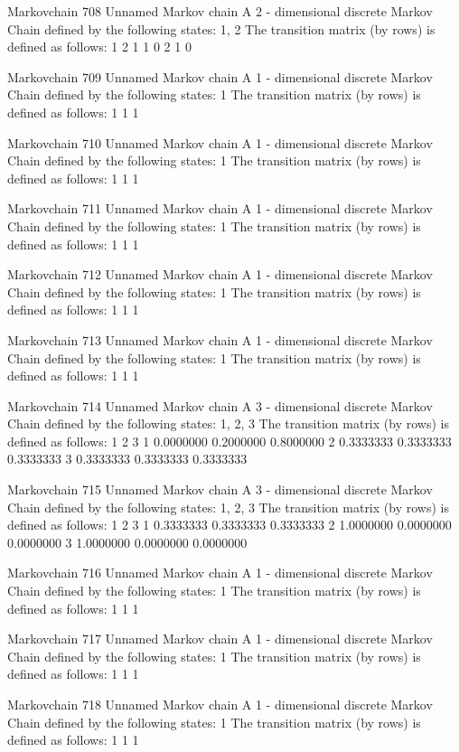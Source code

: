 \documentclass[
  nojss]{jss}
\begin{document}
\begin{CodeChunk}
\begin{CodeOutput}
Markovchain  708 
Unnamed Markov chain 
 A  2 - dimensional discrete Markov Chain defined by the following states: 
 1, 2 
 The transition matrix  (by rows)  is defined as follows: 
  1 2
1 1 0
2 1 0

Markovchain  709 
Unnamed Markov chain 
 A  1 - dimensional discrete Markov Chain defined by the following states: 
 1 
 The transition matrix  (by rows)  is defined as follows: 
  1
1 1

Markovchain  710 
Unnamed Markov chain 
 A  1 - dimensional discrete Markov Chain defined by the following states: 
 1 
 The transition matrix  (by rows)  is defined as follows: 
  1
1 1

Markovchain  711 
Unnamed Markov chain 
 A  1 - dimensional discrete Markov Chain defined by the following states: 
 1 
 The transition matrix  (by rows)  is defined as follows: 
  1
1 1

Markovchain  712 
Unnamed Markov chain 
 A  1 - dimensional discrete Markov Chain defined by the following states: 
 1 
 The transition matrix  (by rows)  is defined as follows: 
  1
1 1

Markovchain  713 
Unnamed Markov chain 
 A  1 - dimensional discrete Markov Chain defined by the following states: 
 1 
 The transition matrix  (by rows)  is defined as follows: 
  1
1 1

Markovchain  714 
Unnamed Markov chain 
 A  3 - dimensional discrete Markov Chain defined by the following states: 
 1, 2, 3 
 The transition matrix  (by rows)  is defined as follows: 
          1         2         3
1 0.0000000 0.2000000 0.8000000
2 0.3333333 0.3333333 0.3333333
3 0.3333333 0.3333333 0.3333333

Markovchain  715 
Unnamed Markov chain 
 A  3 - dimensional discrete Markov Chain defined by the following states: 
 1, 2, 3 
 The transition matrix  (by rows)  is defined as follows: 
          1         2         3
1 0.3333333 0.3333333 0.3333333
2 1.0000000 0.0000000 0.0000000
3 1.0000000 0.0000000 0.0000000

Markovchain  716 
Unnamed Markov chain 
 A  1 - dimensional discrete Markov Chain defined by the following states: 
 1 
 The transition matrix  (by rows)  is defined as follows: 
  1
1 1

Markovchain  717 
Unnamed Markov chain 
 A  1 - dimensional discrete Markov Chain defined by the following states: 
 1 
 The transition matrix  (by rows)  is defined as follows: 
  1
1 1

Markovchain  718 
Unnamed Markov chain 
 A  1 - dimensional discrete Markov Chain defined by the following states: 
 1 
 The transition matrix  (by rows)  is defined as follows: 
  1
1 1


\end{CodeOutput}
\end{CodeChunk}
\end{document}
